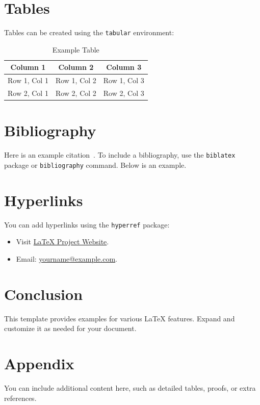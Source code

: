 \documentclass[a4paper, 12pt]{article}
\begin{document}
\section{Tables}
Tables can be created using the \texttt{tabular} environment:
\begin{table}[h!]
    \centering
    \begin{tabular}{|c|c|c|}
        \hline
        \textbf{Column 1} & \textbf{Column 2} & \textbf{Column 3} \\ \hline
        Row 1, Col 1 & Row 1, Col 2 & Row 1, Col 3 \\ \hline
        Row 2, Col 1 & Row 2, Col 2 & Row 2, Col 3 \\ \hline
    \end{tabular}
    \caption{Example Table}
    \label{tab:example}
\end{table}

\section{Bibliography}
Here is an example citation~\cite{example}.
To include a bibliography, use the \texttt{biblatex} package or \texttt{bibliography} command. Below is an example.




\section{Hyperlinks}
You can add hyperlinks using the \texttt{hyperref} package:
\begin{itemize}
    \item Visit \href{https://www.latex-project.org}{LaTeX Project Website}.
    \item Email: \href{mailto:yourname@example.com}{yourname@example.com}.
\end{itemize}

\section{Conclusion}
This template provides examples for various LaTeX features. Expand and customize it as needed for your document.

\appendix
\section{Appendix}
You can include additional content here, such as detailed tables, proofs, or extra references.
\end{document}

